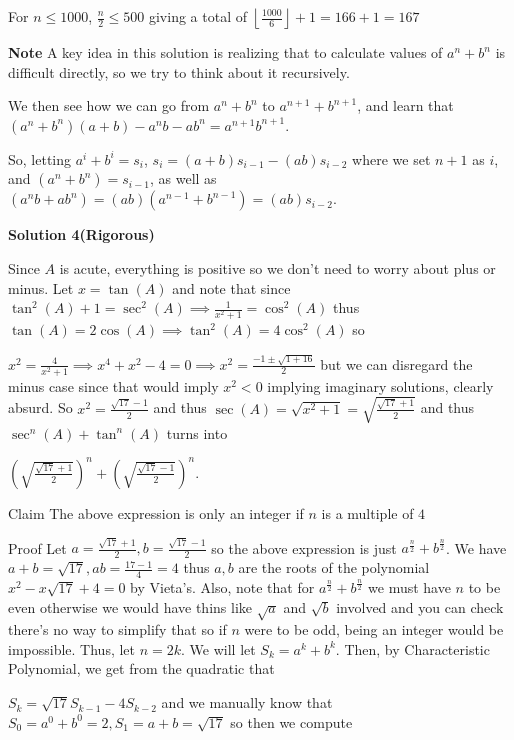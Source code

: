 \begin{enumerate}
 For $n \le 1000$, $\frac{n}{2} \le 500$ giving a total of $\left\lfloor \frac{1000}{6} \right\rfloor + 1 = 166 + 1 = \boxed{167}$

 \textbf{Note} A key idea in this solution is realizing that to calculate values of $a^n+b^n$ is difficult directly, so we try to think about it recursively.

 We then see how we can go from $a^n+b^n$ to $a^{n+1}+b^{n+1}$, and learn that $(a^n+b^n)(a+b)-a^nb-ab^n=a^{n+1}b^{n+1}$. 

 So, letting $a^i+b^i=s_i$, $s_i=(a+b)s_{i-1}-(ab)s_{i-2}$ where we set $n+1$ as $i$, and $(a^n+b^n)=s_{i-1}$, as well as $(a^nb+ab^n)=(ab)(a^{n-1}+b^{n-1})=(ab)s_{i-2}$.

 



\textbf{Solution 4(Rigorous)}

Since $A$ is acute, everything is positive so we don't need to worry about plus or minus. Let $x = \tan(A)$ and note that since $\tan^2(A) + 1 = \sec^2(A) \implies \frac{1}{x^2 + 1} = \cos^2(A)$ thus $\tan(A) = 2 \cos(A) \implies \tan^2(A) = 4\cos^2(A)$ so

 $x^2 = \frac{4}{x^2 + 1} \implies x^4 + x^2 - 4 = 0 \implies x^2 = \frac{-1 \pm \sqrt{1 + 16}}{2}$ but we can disregard the minus case since that would imply $x^2 < 0$ implying imaginary solutions, clearly absurd. So $x^2 = \frac{\sqrt{17} - 1}{2}$ and thus $\sec(A) = \sqrt{x^2 + 1} = \sqrt{\frac{\sqrt{17} + 1}{2}}$ and thus $\sec^n(A) + \tan^n(A)$ turns into

 $(\sqrt{\frac{\sqrt{17} + 1}{2}})^n + (\sqrt{\frac{\sqrt{17} - 1}{2}})^n$.

 Claim The above expression is only an integer if $n$ is a multiple of $4$

 Proof Let $a = \frac{\sqrt{17} + 1}{2}, b = \frac{\sqrt{17} - 1}{2}$ so the above expression is just $a^{\frac{n}{2}} + b^{\frac{n}{2}}$. We have $a + b = \sqrt{17}, ab = \frac{17 - 1}{4} = 4$ thus $a, b$ are the roots of the polynomial $x^2 - x\sqrt{17} + 4 = 0$ by Vieta's. Also, note that for $a^{\frac{n}{2}} + b^{\frac{n}{2}}$ we must have $n$ to be even otherwise we would have thins like $\sqrt{a}$ and $\sqrt{b}$ involved and you can check there's no way to simplify that so if $n$ were to be odd, being an integer would be impossible. Thus, let $n = 2k$. We will let $S_k = a^k + b^k$. Then, by Characteristic Polynomial, we get from the quadratic that

 $S_k = \sqrt{17} S_{k - 1} - 4S_{k - 2}$ and we manually know that $S_0 = a^0 + b^0 = 2, S_1 = a + b = \sqrt{17}$ so then we compute


\end{enumerate}
